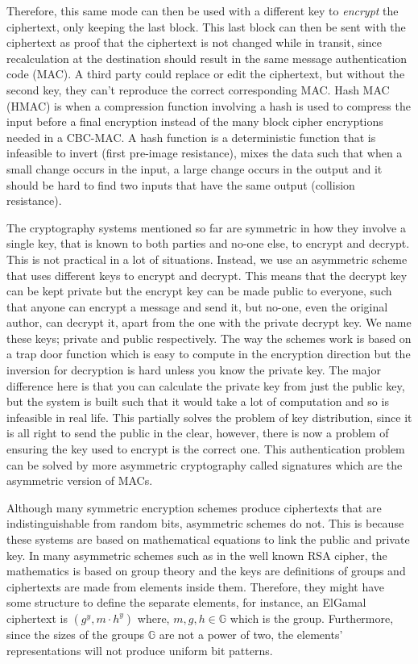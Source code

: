 \documentclass[ %
                    author={Samuel Russell},
                supervisor={Prof. Bogdan Warinschi},
                    degree={MEng},
                     title={Innocuous Ciphertexts},
                  subtitle={The DE-CENSOR Scheme},
                      type={Research},
                      year={2018} ]{dissertation}
\begin{document}
Therefore, this same mode can then be used with a different key to \textit{encrypt} the ciphertext, only keeping the last block. This last block can then be sent with the ciphertext as proof that the ciphertext is not changed while in transit, since recalculation at the destination should result in the same message authentication code (MAC).
A third party could replace or edit the ciphertext, but without the second key, they can't reproduce the correct corresponding MAC.
Hash MAC (HMAC) is when a compression function involving a hash is used to compress the input before a final encryption instead of the many block cipher encryptions needed in a CBC-MAC.
A hash function is a deterministic function that is infeasible to invert (first pre-image resistance), mixes the data such that when a small change occurs in the input, a large change occurs in the output and it should be hard to find two inputs that have the same output (collision resistance).

The cryptography systems mentioned so far are symmetric in how they involve a single key, that is known to both parties and no-one else, to encrypt and decrypt.
This is not practical in a lot of situations.
Instead, we use an asymmetric scheme that uses different keys to encrypt and decrypt.
This means that the decrypt key can be kept private but the encrypt key can be made public to everyone, such that anyone can encrypt a message and send it, but no-one, even the original author, can decrypt it, apart from the one with the private decrypt key.
We name these keys; private and public respectively.
The way the schemes work is based on a trap door function which is easy to compute in the encryption direction but the inversion for decryption is hard unless you know the private key.
The major difference here is that you can calculate the private key from just the public key, but the system is built such that it would take a lot of computation and so is infeasible in real life.
This partially solves the problem of key distribution, since it is all right to send the public in the clear, however, there is now a problem of ensuring the key used to encrypt is the correct one.
This authentication problem can be solved by more asymmetric cryptography called signatures which are the asymmetric version of MACs.

Although many symmetric encryption schemes produce ciphertexts that are indistinguishable from random bits, asymmetric schemes do not.
This is because these systems are based on mathematical equations to link the public and private key.
In many asymmetric schemes such as in the well known RSA cipher, the mathematics is based on group theory and the keys are definitions of groups and ciphertexts are made from elements inside them.
Therefore, they might have some structure to define the separate elements, for instance, an ElGamal ciphertext is $(g^y, m \cdot h^y )$ where, $m,g,h \in \mathbb{G}$ which is the group.
Furthermore, since the sizes of the groups $\mathbb{G}$ are not a power of two, the elements' representations will not produce uniform bit patterns.
\end{document}
